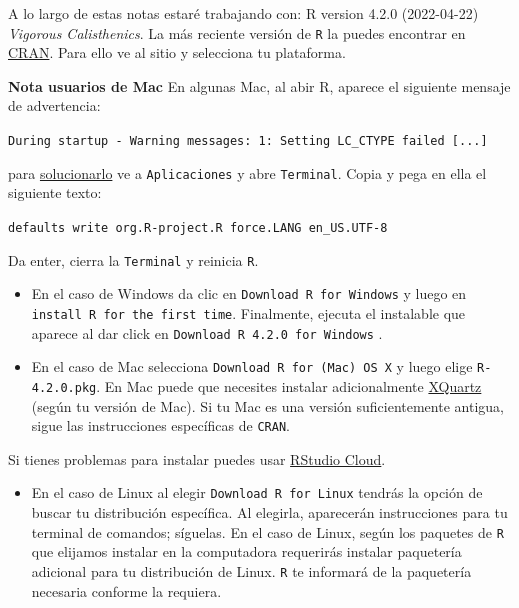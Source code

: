 \documentclass[]{tufte-book}
\providecommand{\tightlist}{%
  \setlength{\itemsep}{0pt}\setlength{\parskip}{0pt}}
\begin{document}
A lo largo de estas notas estaré trabajando con: R version 4.2.0
(2022-04-22) \emph{Vigorous Calisthenics}. La más reciente versión de
\texttt{R} la puedes encontrar en
\href{https://cran.r-project.org}{CRAN}. Para ello ve al sitio y
selecciona tu plataforma.

\begin{marginfigure}
\textbf{Nota usuarios de Mac} En algunas Mac, al abir R, aparece el
siguiente mensaje de advertencia:

\texttt{During\ startup\ -\ Warning\ messages:\ 1:\ Setting\ LC\_CTYPE\ failed\ {[}...{]}}

para
\href{https://stackoverflow.com/questions/9689104/installing-r-on-mac-warning-messages-setting-lc-ctype-failed-using-c}{solucionarlo}
ve a \texttt{Aplicaciones} y abre \texttt{Terminal}. Copia y pega en
ella el siguiente texto:

\texttt{defaults\ write\ org.R-project.R\ force.LANG\ en\_US.UTF-8}

Da enter, cierra la \texttt{Terminal} y reinicia \texttt{R}.
\end{marginfigure}

\begin{itemize}
\item
  En el caso de Windows da clic en \texttt{Download\ R\ for\ Windows} y
  luego en \texttt{install\ R\ for\ the\ first\ time}. Finalmente,
  ejecuta el instalable que aparece al dar click en
  \texttt{Download\ R\ 4.2.0\ for\ Windows} .
\item
  En el caso de Mac selecciona \texttt{Download\ R\ for\ (Mac)\ OS\ X} y
  luego elige \texttt{R-4.2.0.pkg}. En Mac puede que necesites instalar
  adicionalmente \href{https://www.xquartz.org}{XQuartz} (según tu
  versión de Mac). Si tu Mac es una versión suficientemente antigua,
  sigue las instrucciones específicas de \texttt{CRAN}.
\end{itemize}

\begin{marginfigure}
Si tienes problemas para instalar puedes usar
\href{https://rstudio.cloud}{RStudio Cloud}.
\end{marginfigure}

\begin{itemize}
\tightlist
\item
  En el caso de Linux al elegir \texttt{Download\ R\ for\ Linux} tendrás
  la opción de buscar tu distribución específica. Al elegirla,
  aparecerán instrucciones para tu terminal de comandos; síguelas. En el
  caso de Linux, según los paquetes de \texttt{R} que elijamos instalar
  en la computadora requerirás instalar paquetería adicional para tu
  distribución de Linux. \texttt{R} te informará de la paquetería
  necesaria conforme la requiera.
\end{itemize}
\end{document}
